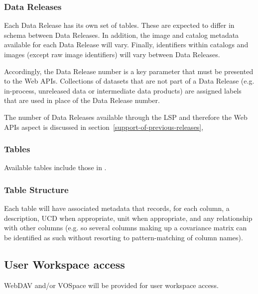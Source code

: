 \subsubsection{Data Releases}\label{data-releases}

Each Data Release has its own set of tables.  These are expected to differ in
schema between Data Releases.  In addition, the image and catalog metadata
available for each Data Release will vary.  Finally, identifiers within
catalogs and images (except raw image identifiers) will vary between Data
Releases.

Accordingly, the Data Release number is a key parameter that must be
presented to the Web APIs.  Collections of datasets that are not part of
a Data Release (e.g. in-process, unreleased data or intermediate data
products) are assigned labels that are used in place of the Data Release
number.

The number of Data Releases available through the LSP and therefore the Web
APIs aspect is discussed in section~\ref{support-of-previous-releases}, 

\subsubsection{Tables}\label{tables}

Available tables include those in .

\subsubsection{Table Structure}\label{table-structure}

Each table will have associated metadata that records, for each column, a
description, UCD when appropriate, unit when appropriate, and any relationship
with other columns (e.g. so several columns making up a covariance matrix can
be identified as such without resorting to pattern-matching of column names).

\subsection{User Workspace access}\label{user-workspace-access}

WebDAV and/or VOSpace will be provided for user workspace access.

